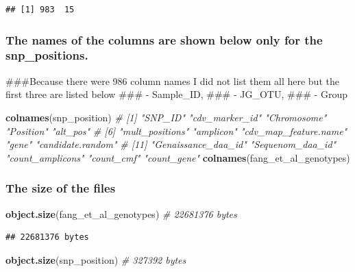 \documentclass[
]{article}
\newenvironment{Shaded}{\begin{snugshade}}{\end{snugshade}}
\newcommand{\CommentTok}[1]{\textcolor[rgb]{0.56,0.35,0.01}{\textit{#1}}}
\newcommand{\FunctionTok}[1]{\textcolor[rgb]{0.13,0.29,0.53}{\textbf{#1}}}
\newcommand{\NormalTok}[1]{#1}
\begin{document}
\begin{verbatim}
## [1] 983  15
\end{verbatim}

\subsubsection{The names of the columns are shown below only for the
snp\_positions.}\label{the-names-of-the-columns-are-shown-below-only-for-the-snp_positions.}

\#\#\#Because there were 986 column names I did not list them all here
but the first three are listed below \#\#\# - Sample\_ID, \#\#\# -
JG\_OTU, \#\#\# - Group

\begin{Shaded}
\begin{Highlighting}[]
\FunctionTok{colnames}\NormalTok{(snp\_position) }\CommentTok{\# [1] "SNP\_ID"               "cdv\_marker\_id"        "Chromosome"           "Position"             "alt\_pos"             }
                       \CommentTok{\# [6] "mult\_positions"       "amplicon"             "cdv\_map\_feature.name" "gene"                 "candidate.random"    }
                       \CommentTok{\# [11] "Genaissance\_daa\_id"   "Sequenom\_daa\_id"      "count\_amplicons"      "count\_cmf"            "count\_gene"          }
\FunctionTok{colnames}\NormalTok{(fang\_et\_al\_genotypes)}
\end{Highlighting}
\end{Shaded}

\subsubsection{The size of the files}\label{the-size-of-the-files}

\begin{Shaded}
\begin{Highlighting}[]
\FunctionTok{object.size}\NormalTok{(fang\_et\_al\_genotypes) }\CommentTok{\# 22681376 bytes}
\end{Highlighting}
\end{Shaded}

\begin{verbatim}
## 22681376 bytes
\end{verbatim}

\begin{Shaded}
\begin{Highlighting}[]
\FunctionTok{object.size}\NormalTok{(snp\_position) }\CommentTok{\# 327392 bytes}
\end{Highlighting}
\end{Shaded}
\end{document}
